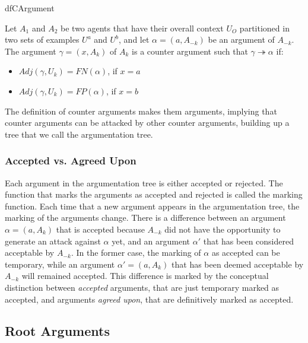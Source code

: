 \begin{restatable}{df}{CArgument}
\label{def:CArg}

Let $A_{1}$ and $A_{2}$ be two agents that have their overall context $U_{O}$ partitioned in two sets of examples $U^{a}$ and $U^{b}$, and let $\alpha = (a,A_{-k})$ be an argument of $A_{-k}$. The argument $\gamma = (x,A_{k})$ of $A_{k}$ is a counter argument  such that $\gamma \twoheadrightarrow \alpha$ if:

\begin{itemize}
    \item $Adj(\gamma,U_{k}) = FN(\alpha)$, if $x = a$
    \item $Adj(\gamma,U_{k}) = FP(\alpha)$, if $x = b$
\end{itemize}

\end{restatable}

The definition of counter arguments makes them arguments, implying that counter arguments can be attacked by other counter arguments, building up a tree that we call the argumentation tree.

\subsubsection{Accepted vs. Agreed Upon}

Each argument in the argumentation tree is either accepted or rejected. The function that marks the arguments as accepted and rejected is called the marking function. Each time that a new argument appears in the argumentation tree, the marking of the arguments change. There is a difference between an argument $\alpha = (a,A_{k})$ that is accepted because $A_{-k}$ did not have the opportunity to generate an attack against $\alpha$ yet, and an argument $\alpha'$ that has been considered acceptable by $A_{-k}$. In the former case, the marking of $\alpha$ as accepted can be temporary, while an argument $\alpha' = (a,A_{k})$ that has been deemed acceptable by $A_{-k}$ will remained accepted. This difference is marked by the conceptual distinction between \emph{accepted} arguments, that are just temporary marked as accepted, and arguments \emph{agreed upon}, that are definitively marked as accepted.

\subsection{Root Arguments}

